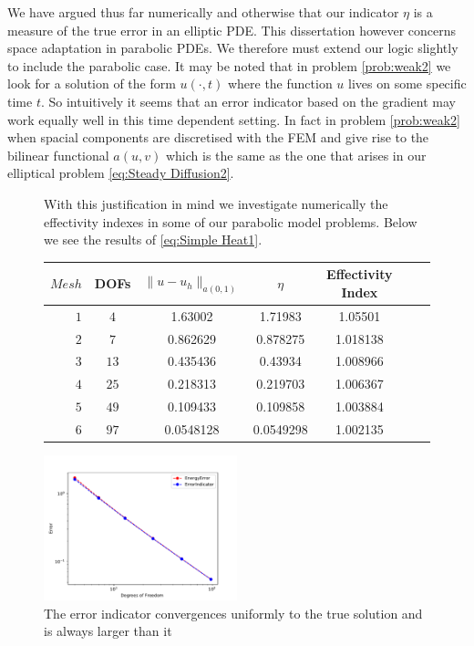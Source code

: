 \documentclass{uonmathreport}
\theoremstyle{definition}
\theoremstyle{problem}
\theoremstyle{theorem}
\begin{document}
We have argued thus far numerically and otherwise that our indicator $\eta$ is a measure of the true error in an elliptic PDE. This dissertation however concerns space adaptation in parabolic PDEs. We therefore must extend our logic slightly to include the parabolic case.
It may be noted that in problem \ref{prob:weak2} we look for a solution of the form $u(\cdot , t)$ where the function $u$ lives on some specific time $t$. So intuitively it seems that an error indicator based on the gradient may work equally well in this time dependent setting. In fact in problem \ref{prob:weak2} when spacial components are discretised with the FEM and give rise to the bilinear functional $a(u, v)$ which is the same as the one that arises in our elliptical problem \ref{eq:Steady Diffusion2}.


\begin{figure}
With this justification in mind we investigate numerically the effectivity indexes in some of our parabolic model problems. Below we see the results of \ref{eq:Simple Heat1}.  
\begin{center}
  \begin{tabular}{r|cccccc}  \label{table:IndicatorPDE1}
    $Mesh$   & DOFs & $\|u-u_h\|_{a(0,1)}$ & $\eta$ & Effectivity Index  \\ \hline
    $1$ & $4$ & 1.63002 &  1.71983  &  1.05501\\
    $2$ & $7$ & 0.862629 &  0.878275 & 1.018138 \\
    $3$ & $13$ & 0.435436 & 0.43934  & 1.008966  \\
	$4$ & $25$ & 0.218313 &  0.219703  &1.006367\\
    $5$ & $49$ & 0.109433 &  0.109858 & 1.003884 \\
    $6$ & $97$ & 0.0548128 &  0.0549298  & 1.002135\\
  \end{tabular}
\end{center}

\caption{The error indicator convergences uniformly to the true solution and is always larger than it}
   \includegraphics[width=0.5\textwidth]{IndicatorPDE1.pdf}
   
 \label{fig:IndicatorPDE1}
\end{figure}
\end{document}
